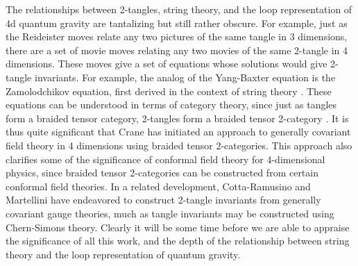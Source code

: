 \documentclass[12pt]{article}
\begin{document}
The relationships between 2-tangles, string theory, and the loop
representation of 4d quantum gravity are tantalizing but still rather
obscure.   For example, just as the Reideister moves relate any two
pictures of the same tangle in 3 dimensions, there are a set of movie moves
relating any two movies of the same 2-tangle in 4 dimensions.   These moves
give a set of equations whose solutions would give 2-tangle invariants.
For example, the analog of the Yang-Baxter equation is the Zamolodchikov
equation, first derived in the context of string theory \cite{Zam}.   These
equations can be understood in terms of category theory, since just as
tangles form a braided tensor category, 2-tangles form a braided tensor
2-category \cite{Fischer}.  It is thus quite significant that Crane
\cite{Crane} has initiated an approach to generally covariant field theory
in 4 dimensions using braided tensor 2-categories. This approach also
clarifies some of the significance of conformal field theory for
4-dimensional physics, since braided tensor 2-categories can be constructed
from certain conformal field theories.   In a related development,
Cotta-Ramusino and Martellini \cite{CM} have endeavored to construct
2-tangle invariants from generally covariant gauge theories, much as tangle
invariants may be constructed using Chern-Simons theory.   Clearly it will
be some time before we are able to appraise the significance of all this
work, and the depth of the relationship between string theory and the loop
representation of quantum gravity.
\end{document}
